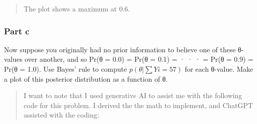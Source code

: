 \documentclass[
  letterpaper,
  DIV=11,
  numbers=noendperiod]{scrartcl}
\begin{document}
\begin{quote}
The plot shows a maximum at 0.6.
\end{quote}

\subsubsection{Part c}\label{part-c-2}

Now suppose you originally had no prior information to believe one of
these θ-values over another, and so Pr(θ = 0.0) = Pr(θ = 0.1) = · · · =
Pr(θ = 0.9) = Pr(θ = 1.0). Use Bayes' rule to compute
\(p(θ| \sum Yi = 57)\) for each θ-value. Make a plot of this posterior
distribution as a function of θ.

\begin{quote}
I want to note that I used generative AI to assist me with the following
code for this problem. I derived the the math to implement, and ChatGPT
assisted with the coding:
\end{quote}
\end{document}
